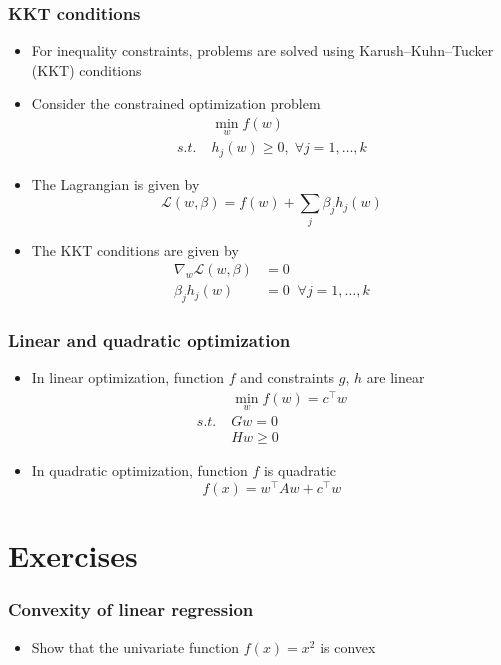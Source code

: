 \documentclass[10pt]{beamer}
\begin{document}
\begin{frame}
  \frametitle{KKT conditions}
  \begin{itemize}
    \item For {\color{red} inequality constraints}, problems are solved using {\color{red} Karush–Kuhn–Tucker (KKT) conditions}
	\item Consider the constrained optimization problem
	\begin{align*}
	& \min_w f(w)\\
	s.t. \; & h_j(w) \geq 0, \; \forall j = 1,\ldots,k
	\end{align*}
	\item The Lagrangian is given by
	\[\mathcal{L}(w,\beta) = f(w) + \sum_j \beta_j h_j(w)\]
	\item The KKT conditions are given by
	\begin{align*}
	\nabla_w \mathcal{L}(w,\beta) &= 0\\
	\beta_j h_j(w) &= 0 \;\; \forall j = 1,\ldots,k
	\end{align*}
  \end{itemize}
\end{frame}

\begin{frame}
  \frametitle{Linear and quadratic optimization}
  \begin{itemize}
    \item In linear optimization, function $f$ and constraints $g$, $h$ are linear
	\begin{align*}
	& \min_w f(w) = c^\top w\\
	s.t. \; & Gw = 0\\
	 & Hw \geq 0
	\end{align*}
    \item In quadratic optimization, function $f$ is quadratic
	\[f(x) = w^\top A w + c^\top w\]
  \end{itemize}
\end{frame}

\section{Exercises}

\begin{frame}
  \frametitle{Convexity of linear regression}
  \begin{itemize}
	\item Show that the univariate function $f(x) = x^2$ is convex
  \end{itemize}
\end{frame}
\end{document}
